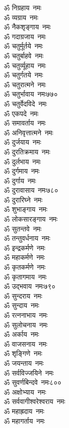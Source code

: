 \begin{multicols}{2}
\begin{flushleft}
ॐ निग्रहाय~नमः\\
ॐ व्यग्राय~नमः\\
ॐ नैकशृङ्गाय~नमः\\
ॐ गदाग्रजाय~नमः\\
ॐ चतुर्मूर्तये~नमः\\
ॐ चतुर्बाहवे~नमः\\
ॐ चतुर्व्यूहाय~नमः\\
ॐ चतुर्गतये~नमः\\
ॐ चतुरात्मने~नमः\\
ॐ चतुर्भावाय~नमः\hfill ७७०\\
ॐ चतुर्वेदविदे~नमः\\
ॐ एकपदे~नमः\\
ॐ समावर्ताय~नमः\\
ॐ अनिवृत्तात्मने~नमः\\
ॐ दुर्जयाय~नमः\\
ॐ दुरतिक्रमाय~नमः\\
ॐ दुर्लभाय~नमः\\
ॐ दुर्गमाय~नमः\\
ॐ दुर्गाय~नमः\\
ॐ दुरावासाय~नमः\hfill ७८०\\
ॐ दुरारिघ्ने~नमः\\
ॐ शुभाङ्गाय~नमः\\
ॐ लोकसारङ्गाय~नमः\\
ॐ सुतन्तवे~नमः\\
ॐ तन्तुवर्धनाय~नमः\\
ॐ इन्द्रकर्मणे~नमः\\
ॐ महाकर्मणे~नमः\\
ॐ कृतकर्मणे~नमः\\
ॐ कृतागमाय~नमः\\
ॐ उद्भवाय~नमः\hfill ७९०\\
ॐ सुन्दराय~नमः\\
ॐ सुन्दाय~नमः\\
ॐ रत्ननाभाय~नमः\\
ॐ सुलोचनाय~नमः\\
ॐ अर्काय~नमः\\
ॐ वाजसनाय~नमः\\
ॐ शृङ्गिणे~नमः\\
ॐ जयन्ताय~नमः\\
ॐ सर्वविज्जयिने~नमः\\
ॐ सुवर्णबिन्दवे~नमः\hfill ८००\\
ॐ अक्षोभ्याय~नमः\\
ॐ सर्ववागीश्वरेश्वराय~नमः\\
ॐ महाह्रदाय~नमः\\
ॐ महागर्ताय~नमः\\

\end{flushleft}
\end{multicols}
